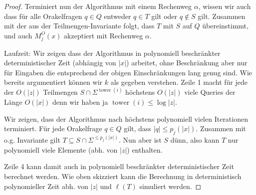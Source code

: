 \documentclass[nofonts]{uebung}
\theoremstyle{definition}
\DeclareMathOperator{\tower}{tower}
\begin{document}
\begin{proof}
    Terminiert nun der Algorithmus mit einem Rechenweg $\alpha$, wissen wir auch dass für alle Orakelfragen $q\in Q$ entweder $q\in T$ gilt oder $q\not\in S$ gilt.
    Zusammen mit der aus der Teilmengen-Invariante folgt, dass  $T$ mit $S$ auf $Q$ übereinstimmt, und auch $M_j^O(x)$ akzeptiert mit Rechenweg $\alpha$.

    Laufzeit: Wir zeigen dass der Algorithmus in polynomiell beschränkter deterministischer Zeit (abhängig von $|x|$) arbeitet, ohne Beschränkung aber nur für Eingaben die entsprechend der obigen Einschränkungen lang genug sind. Wie bereits argumentiert können wir $k$ als gegeben verstehen.
    Zeile 1 macht für jede der $O(|z|)$ Teilmengen $S\cap\Sigma^{\tower(i)}$ höchstens $O(|z|)$ viele Queries der Länge $O(|x|)$ denn wir haben ja $\tower(i)\leq \log|z|$.

    Wir zeigen, dass der Algorithmus nach höchstens polynomiell vielen Iterationen terminiert.
    Für jede Orakelfrage $q\in Q$ gilt, dass $|q|\leq p_j(|x|)$.
    Zusammen mit o.g. Invariante gilt $T\subseteq S\cap\Sigma^{\leq p_j(|x|)}$.
    Nun aber ist $S$ dünn, also kann $T$ nur polynomiell viele Elemente (abh. von $|z|$) enthalten.

    Zeile 4 kann damit auch in polynomiell beschränkter deterministischer Zeit berechnet werden. Wie oben skizziert kann die Berechnung in deterministisch polynomieller Zeit abh. von $|z|$ und $\ell(T)$ simuliert werden.
\end{proof}
\end{document}
